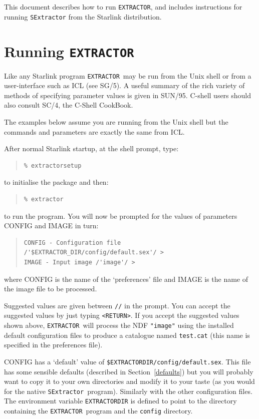 \documentclass[twoside,11pt]{article}
\newcommand{\htmlref}[2]{#1}
\newcommand{\latex}[1]{#1}
\newcommand{\xref}[3]{#1}
\newcommand{\xlabel}[1]{}
\renewcommand{\_}{\texttt{\symbol{95}}}
\newcommand{\EXTRACTOR}{\texttt{EXTRACTOR}}
\newcommand{\SExtractor}{\texttt{SExtractor}}
\begin{document}
This document describes how to run \EXTRACTOR, and includes
\htmlref{instructions for running \SExtractor}{running_sextractor}
from the Starlink distribution.

\section{\xlabel{running_extractor}Running \EXTRACTOR}

Like any Starlink program \EXTRACTOR\ may be run from the
Unix shell or from a user-interface such as
\xref{ICL}{sg5}{abstract} \latex{(see SG/5)}.
A useful summary of the rich variety of methods of specifying parameter values
is given in \xref{SUN/95}{sun95}{se_param}. C-shell users should also
consult \xref{SC/4}{sc4}{}, the C-Shell CookBook.

The examples below assume you are running from the Unix shell but the commands
and parameters are exactly the same from ICL.

After normal Starlink startup, at the shell prompt, type:
\begin{quote} \begin{verbatim}
% extractorsetup
\end{verbatim} \end{quote}
to initialise the package and then:
\begin{quote} \begin{verbatim}
% extractor
\end{verbatim} \end{quote}
to run the program.  You will now be prompted for the values of parameters
CONFIG and IMAGE in turn:
\begin{quote} \begin{verbatim}
CONFIG - Configuration file /'$EXTRACTOR_DIR/config/default.sex'/ >
IMAGE - Input image /'image'/ >
\end{verbatim} \end{quote}
where CONFIG is the name of the `preferences' file and IMAGE is the name of
the image file to be processed.

Suggested values are given between \texttt{//} in the prompt.  You can
accept the suggested values by just typing \verb!<RETURN>!.  If you
accept the suggested values shown above, \EXTRACTOR\ will process the
NDF \texttt{"image"} using the installed default configuration
files to produce a catalogue named \texttt{test.cat} (this name is
specified in the preferences file).

CONFIG has a `default' value of
\texttt{\$EXTRACTOR\_DIR/config/default.sex}.  This file has some
\htmlref{sensible defaults}{defaults} \latex{(described in
Section~\ref{defaults})} but you will probably want to copy it to your
own directories and modify it to your taste (as you would for the
native \SExtractor\ program).  Similarly with the other configuration
files.  The environment variable \texttt{EXTRACTOR\_DIR} is defined to
point to the directory containing the \EXTRACTOR\ program and the
\texttt{config} directory.
\end{document}
